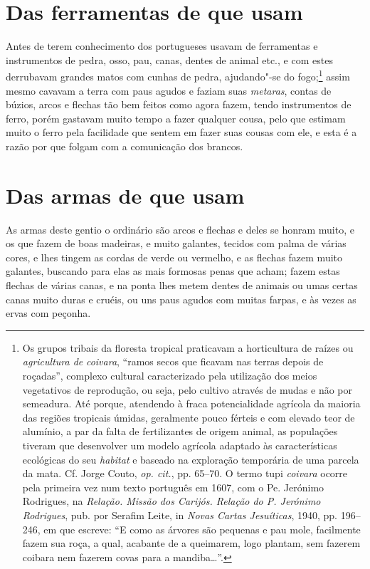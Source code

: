 \section{Das ferramentas de que usam} 
 Antes de terem conhecimento dos portugueses usavam de ferramentas e
instrumentos de pedra, osso, pau, canas, dentes de animal etc., e com
estes derrubavam grandes matos com cunhas de pedra, ajudando"-se do
fogo;\footnote{ Os grupos tribais da floresta tropical praticavam a
horticultura de raízes ou \textit{agricultura de} \textit{coivara}, 
``ramos secos que ficavam nas terras depois de roçadas'', complexo
cultural caracterizado pela utilização dos meios vegetativos de
reprodução, ou seja, pelo cultivo através de mudas e não por semeadura.
Até porque, atendendo à fraca potencialidade agrícola da maioria das
regiões tropicais úmidas, geralmente pouco férteis e com elevado teor
de alumínio, a par da falta de fertilizantes de origem animal, as
populações tiveram que desenvolver um modelo agrícola adaptado às
características ecológicas do seu \textit{habitat} e baseado na
exploração temporária de uma parcela da mata. Cf. Jorge Couto, 
\textit{op. cit.}, pp. 65--70. O termo tupi \textit{coivara} ocorre pela
primeira vez num texto português em 1607, com o Pe. Jerónimo
Rodrigues, na \textit{Relação. Missão dos Carijós. Relação do P.
Jerónimo Rodrigues}, pub. por Serafim Leite, in \textit{Novas Cartas
Jesuíticas}, 1940, pp. 196--246, em que escreve: ``E como as
árvores são pequenas e pau mole, facilmente fazem sua roça, a qual,
acabante de a queimarem, logo plantam, sem fazerem coibara nem fazerem
covas para a mandiba\ldots{}''.} assim mesmo cavavam a terra com paus agudos
e faziam suas \textit{metaras}, contas de búzios, arcos e flechas tão
bem feitos como agora fazem, tendo instrumentos de ferro, porém
gastavam muito tempo a fazer qualquer cousa, pelo que estimam muito o
ferro pela facilidade que sentem em fazer suas cousas com ele, e esta é
a razão por que folgam com a comunicação dos brancos.

\section{Das armas de que usam} 
As armas deste gentio o ordinário são arcos e flechas e deles
se honram muito, e os que fazem de boas madeiras, e muito galantes,
tecidos com palma de várias cores, e lhes tingem as cordas de verde ou
vermelho, e as flechas fazem muito galantes, buscando para elas as mais
formosas penas que acham; fazem estas flechas de várias canas, e na
ponta lhes metem dentes de animais ou umas certas canas muito duras e
cruéis, ou uns paus agudos com muitas farpas, e às vezes as ervas com peçonha. 

